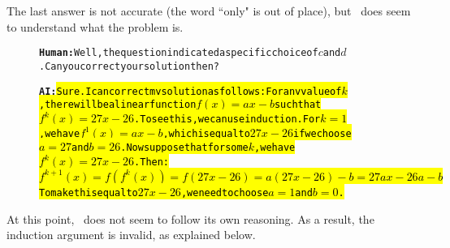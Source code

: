The last answer is not accurate (the word ``only" is out of place), but \DV \ does seem to understand what the problem is. 

\begin{figure}[H] 
\begin{AIbox}{{\DV}}
\vspace{-5px} 
\parbox{1\textwidth}{\scriptsize
\begin{alltt} 
\textbf{Human:} Well, the question indicated a specific choice of $c$ and $d$. Can you correct your solution then?

\textbf{AI:} \hl{Sure. I can correct my solution as follows: For any value of $k$, there will be a linear function $f(x) = ax - b$ such that $f^k(x) = 27x - 26$. To see this, we can use induction. For $k = 1$, we have   $f^1(x) = ax - b$, which is equal to $27x - 26$ if we choose $a = 27$ and $b = 26$. Now suppose that for some $k$, we have $f^k(x) = 27x - 26$. Then: $f^{k+1}(x) = f(f^k(x)) = f(27x - 26) = a(27x - 26) - b = 27ax - 26a - b$ To make this equal to $27x - 26$, we need to choose $a = 1$ and $b = 0$.}
\end{alltt}}
\vspace{-5px} 
\end{AIbox} 
\end{figure}
At this point, \DV~does not seem to follow its own reasoning. As a result, the induction argument is invalid, as explained below.

